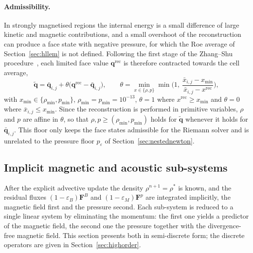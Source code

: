 \documentclass[a4paper,fleqn]{cas-sc}
\theoremstyle{remark}
\newcommand{\eps}{\varepsilon}
\newcommand{\epsM}{\eps_{M}}
\newcommand{\epsB}{\eps_{B}}
\newcommand{\FF}{\mathbf{F}}
\begin{document}
\paragraph{Admissibility.}
\label{sec:zslimiter}
In strongly magnetised regions the internal energy is a small difference of
large kinetic and magnetic contributions, and a small overshoot of the
reconstruction can produce a face state with negative pressure, for which the
Roe average of Section~\ref{sec:hllem} is not defined. Following the first
stage of the Zhang--Shu procedure~\cite{ZhangShu2010}, each limited face value
$\mathbf q^{\mathrm{rec}}$ is therefore contracted towards the cell average,
\begin{equation}
\label{eq:thetascale}
\tilde{\mathbf q}=\bar{\mathbf q}_{i,j}
+\theta\big(\mathbf q^{\mathrm{rec}}-\bar{\mathbf q}_{i,j}\big),
\qquad
\theta=\min_{x\in\{\rho,p\}}
\min\!\Big(1,\ \frac{\bar x_{i,j}-x_{\min}}{\bar x_{i,j}-x^{\mathrm{rec}}}\Big),
\end{equation}
with $x_{\min}\in\{\rho_{\min},p_{\min}\}$, $\rho_{\min}=p_{\min}=10^{-13}$,
$\theta=1$ where $x^{\mathrm{rec}}\ge x_{\min}$ and $\theta=0$ where
$\bar x_{i,j}\le x_{\min}$. Since the reconstruction is performed in primitive
variables, $\rho$ and $p$ are affine in $\theta$, so that
$\rho,p\ge(\rho_{\min},p_{\min})$ holds for $\tilde{\mathbf q}$ whenever it
holds for $\bar{\mathbf q}_{i,j}$. This floor only keeps the face states
admissible for the Riemann solver and is unrelated to the pressure floor
$p_\varepsilon$ of Section~\ref{sec:nestednewton}.
 


\subsection{Implicit magnetic and acoustic sub-systems}
\label{sec:implicit}
After the explicit advective update the density $\rho^{n+1}=\rho^{*}$ is known, and
the residual fluxes $(1-\epsB)\FF^{B}$ and $(1-\epsM)\FF^{p}$ are integrated
implicitly, the magnetic field first and the pressure second. Each sub-system is
reduced to a single linear system by eliminating the momentum: the first one
yields a predictor of the magnetic field, the second one the pressure together
with the divergence-free magnetic field. This section presents both in
semi-discrete form; the discrete operators are given in
Section~\ref{sec:highorder}.
\end{document}
